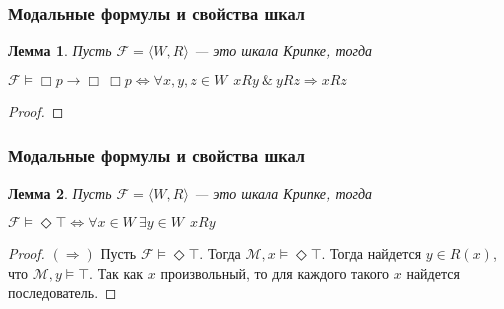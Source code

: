 \documentclass[pdf,utf8,russian,aspectratio=169]{beamer}
\newtheorem{lem}{Лемма}
\begin{document}
\begin{frame}
  \frametitle{Модальные формулы и свойства шкал}

  \begin{lem} Пусть $\mathcal{F} = \langle W, R \rangle$ --- это шкала Крипке, тогда

\begin{center}
    $\mathcal{F} \models \Box p \to \Box \: \Box p \Leftrightarrow \forall x, y, z \in W \:\: x R y \: \& \: y R z \Rightarrow x R z$
\end{center}
  \end{lem}

\begin{proof}
\end{proof}
\end{frame}

\begin{frame}
  \frametitle{Модальные формулы и свойства шкал}

  \begin{lem} Пусть $\mathcal{F} = \langle W, R \rangle$ --- это шкала Крипке, тогда

\begin{center}
    $\mathcal{F} \models \Diamond \top \Leftrightarrow \forall x \in W \: \exists y \in W \:\: x R y$
\end{center}
  \end{lem}

  \begin{proof}
    $(\Rightarrow)$ Пусть $\mathcal{F} \models \Diamond \top$. Тогда $\mathcal{M}, x \models \Diamond \top$. Тогда найдется $y \in R(x)$, что $\mathcal{M}, y \models \top$. Так как $x$ произвольный, то для каждого такого $x$ найдется последователь.
  \end{proof}
\end{frame}
\end{document}
